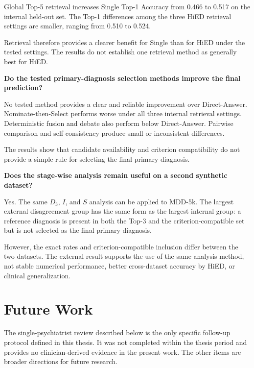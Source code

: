 \documentclass[12pt,a4paper,oneside]{report}
\begin{document}
\begin{description}
Global Top-5 retrieval increases Single Top-1 Accuracy from 0.466 to
0.517 on the internal held-out set. The Top-1 differences among the
three HiED retrieval settings are smaller, ranging from 0.510 to 0.524.

Retrieval therefore provides a clearer benefit for Single than for HiED
under the tested settings. The results do not establish one retrieval
method as generally best for HiED.

\item[RQ4]
\textbf{Do the tested primary-diagnosis selection methods improve the
final prediction?}

No tested method provides a clear and reliable improvement over
Direct-Answer. Nominate-then-Select performs worse under all three
internal retrieval settings. Deterministic fusion and debate also perform
below Direct-Answer. Pairwise comparison and self-consistency produce
small or inconsistent differences.

The results show that candidate availability and criterion compatibility
do not provide a simple rule for selecting the final primary diagnosis.

\item[RQ5]
\textbf{Does the stage-wise analysis remain useful on a second synthetic
dataset?}

Yes. The same $D_3$, $I$, and $S$ analysis can be applied to MDD-5k.
The largest external disagreement group has the same form as the largest
internal group: a reference diagnosis is present in both the Top-3 and
the criterion-compatible set but is not selected as the final primary
diagnosis.

However, the exact rates and criterion-compatible inclusion differ
between the two datasets. The external result supports the use of the
same analysis method, not stable numerical performance, better
cross-dataset accuracy by HiED, or clinical generalization.

\end{description}

\section{Future Work}

The single-psychiatrist review described below is the only specific
follow-up protocol defined in this thesis. It was not completed within
the thesis period and provides no clinician-derived evidence in the
present work. The other items are broader directions for future
research.
\end{document}
